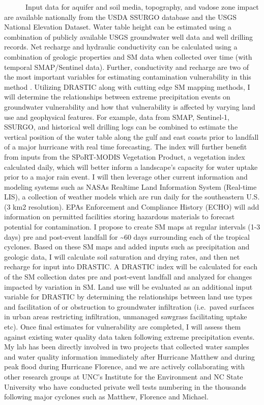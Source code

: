 \documentclass[
]{book}
\begin{document}
~~~~~~Input data for aquifer and soil media, topography, and vadose zone impact are available nationally from the USDA SSURGO database and the USGS National Elevation Dataset. Water table height can be estimated using a combination of publicly available USGS groundwater well data and well drilling records. Net recharge and hydraulic conductivity can be calculated using a combination of geologic properties and SM data when collected over time (with temporal SMAP/Sentinel data). Further, conductivity and recharge are two of the most important variables for estimating contamination vulnerability in this method \citep{babiker2005}. Utilizing DRASTIC along with cutting edge SM mapping methods, I will determine the relationships between extreme precipitation events on groundwater vulnerability and how that vulnerability is affected by varying land use and geophysical features. For example, data from SMAP, Sentinel-1, SSURGO, and historical well drilling logs can be combined to estimate the vertical position of the water table along the gulf and east coasts prior to landfall of a major hurricane with real time forecasting. The index will further benefit from inputs from the SPoRT-MODIS Vegetation Product, a vegetation index calculated daily, which will better inform a landscape's capacity for water uptake prior to a major rain event. I will then leverage other current information and modeling systems such as NASAs Realtime Land Information System (Real-time LIS), a collection of weather models which are run daily for the southeastern U.S. (3 km2 resolution). EPAs Enforcement and Compliance History (ECHO) will add information on permitted facilities storing hazardous materials to forecast potential for contamination. I propose to create SM maps at regular intervals (1-3 days) pre and post-event landfall for \textasciitilde60 days surrounding each of the tropical cyclones. Based on these SM maps and added inputs such as precipitation and geologic data, I will calculate soil saturation and drying rates, and then net recharge for input into DRASTIC. A DRASTIC index will be calculated for each of the SM collection dates pre and post-event landfall and analyzed for changes impacted by variation in SM. Land use will be evaluated as an additional input variable for DRASTIC by determining the relationships between land use types and facilitation of or obstruction to groundwater infiltration (i.e.~paved surfaces in urban areas restricting infiltration, unmanaged sawgrass facilitating uptake etc). Once final estimates for vulnerability are completed, I will assess them against existing water quality data taken following extreme precipitation events. My lab has been directly involved in two projects that collected water samples and water quality information immediately after Hurricane Matthew and during peak flood during Hurricane Florence, and we are actively collaborating with other research groups at UNC's Institute for the Environment and NC State University who have conducted private well tests numbering in the thousands following major cyclones such as Matthew, Florence and Michael.
\end{document}
